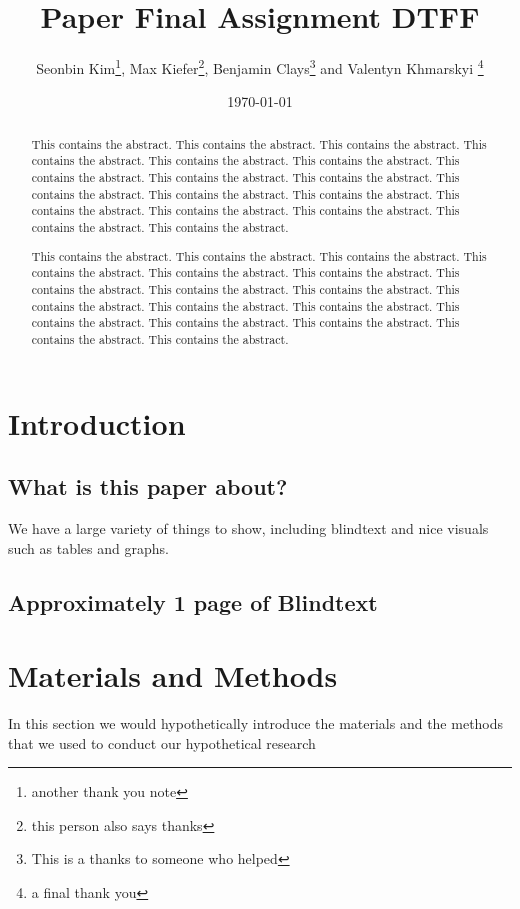 \documentclass[titlepage]{article}
\title{Paper Final Assignment DTFF}
\author{Seonbin Kim\thanks{another thank you note}, Max Kiefer\thanks{this person also says thanks}, Benjamin Clays\thanks{This is a thanks to someone who helped} and Valentyn Khmarskyi \thanks{a final thank you}}
\date{\today}
\affil{Faculty of Business, Economics and Informatics, UZH}
\begin{document}
\maketitle

\begin{abstract}
This contains the abstract. This contains the abstract. This contains the abstract. This contains the abstract. This contains the abstract. This contains the abstract. This contains the abstract. This contains the abstract. This contains the abstract. This contains the abstract. This contains the abstract. This contains the abstract. This contains the abstract. This contains the abstract. This contains the abstract. This contains the abstract. This contains the abstract.
\end{abstract}
\begin{abstract}
This contains the abstract. This contains the abstract. This contains the abstract. This contains the abstract. This contains the abstract. This contains the abstract. This contains the abstract. This contains the abstract. This contains the abstract. This contains the abstract. This contains the abstract. This contains the abstract. This contains the abstract. This contains the abstract. This contains the abstract. This contains the abstract. This contains the abstract.
\end{abstract}
\tableofcontents

\newpage

\section{Introduction}
\subsection{What is this paper about?}
We have a large variety of things to show, including blindtext and nice visuals such as tables and graphs.
\subsection{Approximately 1 page of Blindtext}
\blindtext[1]
\par
\blindtext[2]
\par
\blindtext[2]
\par
\blindtext[1]

\section{Materials and Methods}
In this section we would hypothetically introduce the materials and the methods that we used to conduct our hypothetical research
\end{document}
